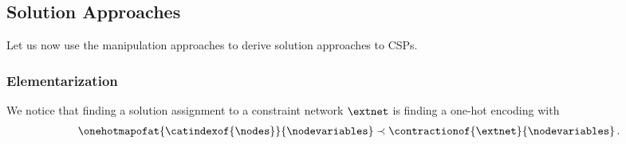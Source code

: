 %
%



\subsection{Solution Approaches}

Let us now use the manipulation approaches to derive solution approaches to CSPs.

\subsubsection{Elementarization}

We notice that finding a solution assignment to a constraint network $\extnet$ is finding a one-hot encoding with
\begin{align*}
    \onehotmapofat{\catindexof{\nodes}}{\nodevariables}
    \prec
    \contractionof{\extnet}{\nodevariables} \, .
\end{align*}

